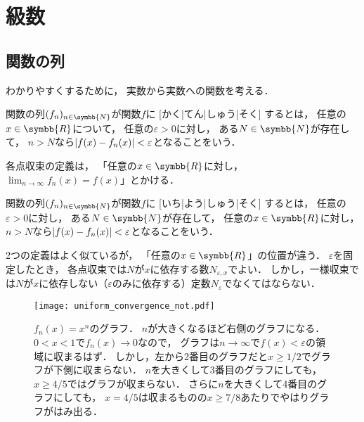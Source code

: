 \documentclass[../sotsu.tex]{subfiles}
\begin{document}
\section{級数}
\label{sec:series}


\subsection{関数の列}

わかりやすくするために，
実数から実数への関数を考える．

\begin{definition}
    \label{dfn:pointwise-convergence}
    関数の列$\sequ{f_n}[n \in \symbb{N}]$が関数$f$に%
    [かく|てん|しゅう|そく]%
    するとは，
    任意の$x \in \symbb{R}$について，
    任意の$\varepsilon > 0$に対し，
    ある$N \in \symbb{N}$が存在して，
    $n > N$なら$\lvert f(x) - f_n (x)\rvert < \varepsilon$となることをいう．
\end{definition}

各点収束の定義は，
「任意の$x \in \symbb{R}$に対し，
$\lim_{n \to \infty} f_n (x) = f(x)$」とかける．

\begin{definition}
    \label{dfn:uniform-convergence}
    関数の列$\sequ{f_n}[n \in \symbb{N}]$が関数$f$に%
    [いち|よう|しゅう|そく]%
    するとは，
    任意の$\varepsilon > 0$に対し，
    ある$N \in \symbb{N}$が存在して，
    任意の$x \in \symbb{R}$に対し，
    $n > N$なら$\lvert f(x) - f_n (x)\rvert < \varepsilon$となることをいう．
\end{definition}

2つの定義はよく似ているが，
「任意の$x \in \symbb{R}$」の位置が違う．
$\varepsilon$を固定したとき，
各点収束では$N$が$x$に依存する数$N_{\varepsilon, x}$でよい．
しかし，一様収束では$N$が$x$に依存しない（$\varepsilon$のみに依存する）定数$N_\varepsilon$でなくてはならない．


\begin{figure}[tbp]
    \centering
    \texttt{[image: uniform\_convergence\_not.pdf]}
    \caption{
        $f_n (x) = x^n$のグラフ．
        $n$が大きくなるほど右側のグラフになる．
        $0 < x < 1$で$f_n (x) \to 0$なので，
        グラフは$n \to \infty$で$f(x) < \varepsilon$の領域に収まるはず．
        しかし，左から2番目のグラフだと$x \geq 1/2$でグラフが下側に収まらない．
        $n$を大きくして3番目のグラフにしても，
        $x \geq 4/5$ではグラフが収まらない．
        さらに$n$を大きくして4番目のグラフにしても，
        $x = 4/5$は収まるものの$x \geq 7/8$あたりでやはりグラフがはみ出る．
    }
    \label{fig:uniform-convergence-not}
\end{figure}
\end{document}
